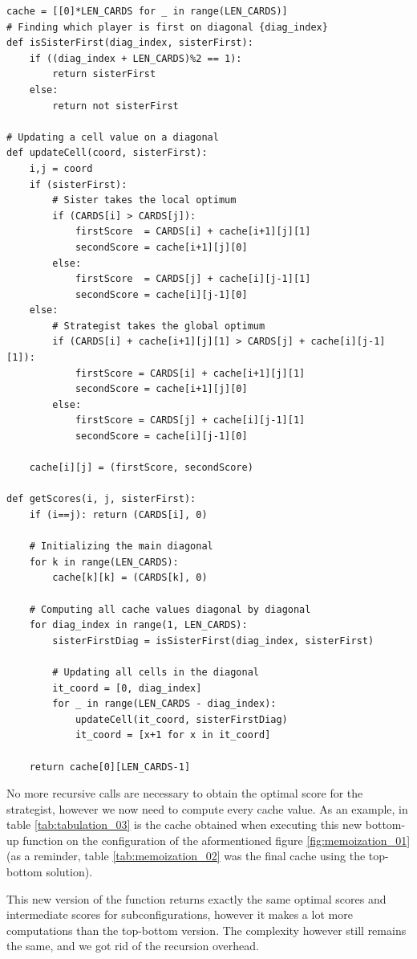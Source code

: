 \documentclass[a4paper,12pt,fleqn]{article}
\newcommand\ezskip{\medskip\noindent}
\begin{document}
\begin{verbatim}
cache = [[0]*LEN_CARDS for _ in range(LEN_CARDS)]
# Finding which player is first on diagonal {diag_index}
def isSisterFirst(diag_index, sisterFirst):
    if ((diag_index + LEN_CARDS)%2 == 1):
        return sisterFirst
    else:
        return not sisterFirst

# Updating a cell value on a diagonal
def updateCell(coord, sisterFirst):
    i,j = coord
    if (sisterFirst):
        # Sister takes the local optimum
        if (CARDS[i] > CARDS[j]):
            firstScore  = CARDS[i] + cache[i+1][j][1]
            secondScore = cache[i+1][j][0]
        else:
            firstScore  = CARDS[j] + cache[i][j-1][1]
            secondScore = cache[i][j-1][0]
    else:
        # Strategist takes the global optimum
        if (CARDS[i] + cache[i+1][j][1] > CARDS[j] + cache[i][j-1][1]):
            firstScore = CARDS[i] + cache[i+1][j][1]
            secondScore = cache[i+1][j][0]
        else:
            firstScore = CARDS[j] + cache[i][j-1][1]
            secondScore = cache[i][j-1][0]
    
    cache[i][j] = (firstScore, secondScore)

def getScores(i, j, sisterFirst):
    if (i==j): return (CARDS[i], 0)

    # Initializing the main diagonal
    for k in range(LEN_CARDS):
        cache[k][k] = (CARDS[k], 0)

    # Computing all cache values diagonal by diagonal
    for diag_index in range(1, LEN_CARDS):
        sisterFirstDiag = isSisterFirst(diag_index, sisterFirst)

        # Updating all cells in the diagonal
        it_coord = [0, diag_index]
        for _ in range(LEN_CARDS - diag_index):
            updateCell(it_coord, sisterFirstDiag)
            it_coord = [x+1 for x in it_coord]

    return cache[0][LEN_CARDS-1]
\end{verbatim}

No more recursive calls are necessary to obtain the optimal score for the strategist, however we now need to compute every cache value.
As an example, in table \ref{tab:tabulation_03} is the cache obtained when executing this new bottom-up function on the configuration of the aformentioned figure \ref{fig:memoization_01} (as a reminder, table \ref{tab:memoization_02} was the final cache using the top-bottom solution).

\ezskip
This new version of the function returns exactly the same optimal scores and intermediate scores for subconfigurations, however it makes a lot more computations than the top-bottom version. The complexity however still remains the same, and we got rid of the recursion overhead.
\end{document}
